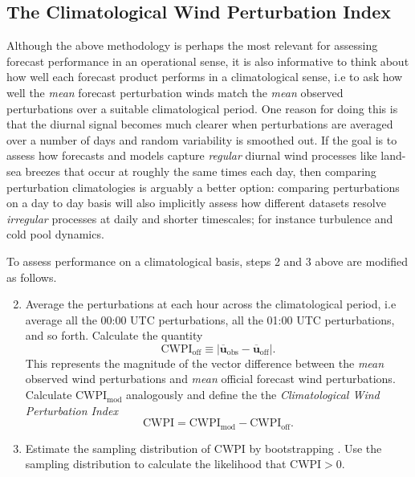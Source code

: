 \documentclass[12pt]{article}
\begin{document}
\subsection{The Climatological Wind Perturbation Index}\label{climatological-performance}
Although the above methodology is perhaps the most relevant for assessing forecast performance in an operational sense, it is also informative to think about how well each forecast product performs in a
climatological sense, i.e to ask how well the \emph{mean} forecast perturbation winds match the \emph{mean} observed perturbations over a suitable climatological period. One reason for doing this is that the diurnal signal becomes much clearer when perturbations are averaged over a number of days and random variability is smoothed out. If the goal is to assess how forecasts and models capture \emph{regular} diurnal wind processes like land-sea breezes that occur at roughly the same times each day, then comparing perturbation climatologies is arguably a better option: comparing perturbations on a day to day basis will also implicitly assess how different datasets resolve \emph{irregular} processes at daily and shorter timescales; for instance turbulence and cold pool dynamics.

To assess performance on a climatological basis, steps 2 and 3 above are modified as follows. 
\begin{enumerate}
\setcounter{enumi}{1}
\item
Average the perturbations at each hour across the climatological period, i.e average all the 00:00 UTC perturbations, all the 01:00 UTC perturbations, and so forth. Calculate the quantity
\begin{equation}
\text{CWPI}_{\text{off}} \equiv \left\lvert \overline{\boldsymbol{u}}_{\text{obs}}-\overline{\boldsymbol{u}}_{\text{off}} \right\rvert.
\end{equation}
This represents the magnitude of the vector difference between the \emph{mean} 
observed wind perturbations and \emph{mean} official forecast wind perturbations. Calculate \(\text{CWPI}_{\text{mod}}\) analogously and define the the \emph{Climatological Wind Perturbation Index}
\begin{equation}
\text{CWPI} = \text{CWPI}_{\text{mod}} - \text{CWPI}_{\text{off}}.
\end{equation}
\item
Estimate the sampling distribution of \(\text{CWPI}\) by bootstrapping
\citep{efron79}. Use the sampling distribution to calculate the likelihood that $\text{CWPI} > 0$.  
\end{enumerate}
\end{document}
